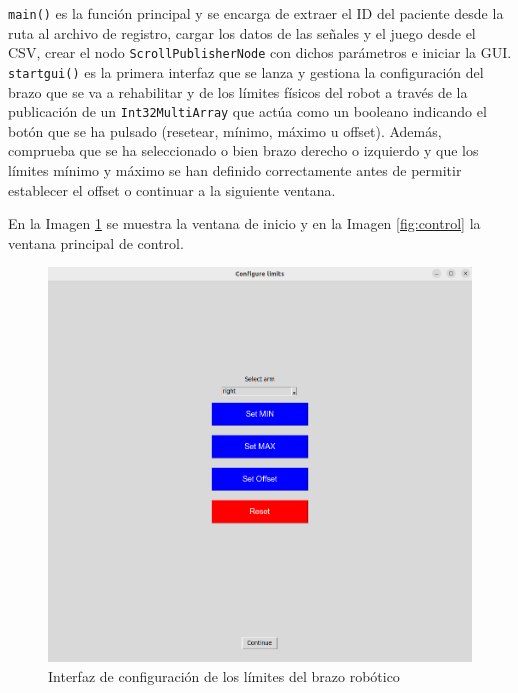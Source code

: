\verb|main()| es la función principal y se encarga de extraer el ID del paciente desde la ruta al archivo de registro, cargar los datos de las señales y el juego desde el CSV, crear el nodo \verb|ScrollPublisherNode| con dichos parámetros e iniciar la GUI.
\verb|startgui()| es la primera interfaz que se lanza y gestiona la configuración del brazo que se va a rehabilitar y de los límites físicos del robot a través de la publicación de un \verb|Int32MultiArray| que actúa como un booleano indicando el botón que se ha pulsado (resetear, mínimo, máximo u offset).
Además, comprueba que se ha seleccionado o bien brazo derecho o izquierdo y que los límites mínimo y máximo se han definido correctamente antes de permitir establecer el offset o continuar a la siguiente ventana.

En la Imagen \ref{fig:config} se muestra la ventana de inicio y en la Imagen \ref{fig:control} la ventana principal de control.

\begin{figure}[ht!]
	\centering
	\begin{minipage}{0.85\linewidth}
		\centering
		\includegraphics[width=\linewidth]{figs/config_limits.png}
	\end{minipage}
	\caption[Interfaz de configuración de los límites del brazo robótico]{Interfaz de configuración de los límites del brazo robótico}
	\label{fig:config}
\end{figure}

